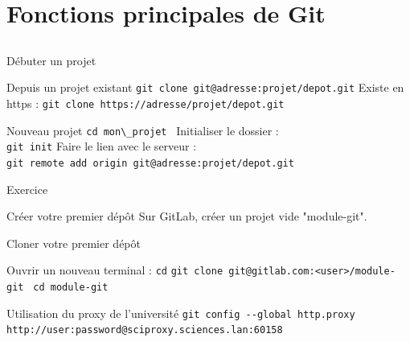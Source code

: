 \documentclass{beamer}
\begin{document}
\section{Fonctions principales de Git}
\subsection{}

\begin{frame}[fragile]{Débuter un projet}

  \begin{block}{Depuis un projet existant}
    \textcolor{commandcolor}{\verb?git clone git@adresse:projet/depot.git?}\linebreak
    Existe en https :\linebreak
    \textcolor{commandcolor}{\verb?git clone https://adresse/projet/depot.git?}
  \end{block}
  \begin{block}{Nouveau projet}
    \textcolor{commandcolor}{\verb?cd mon\_projet ?}\linebreak
    Initialiser le dossier :\\
    \textcolor{commandcolor}{\verb?git init?}\linebreak
    Faire le lien avec le serveur :\\
    \textcolor{commandcolor}{\verb?git remote add origin git@adresse:projet/depot.git?}
  \end{block}
\end{frame}

\begin{frame}[fragile]{Exercice}
  
  
  \begin{exampleblock}{Créer votre premier dépôt}
    Sur GitLab, créer un projet vide "module-git".%
  \end{exampleblock}
  
  \begin{exampleblock}{Cloner votre premier dépôt}
    \begin{small}
      Ouvrir un nouveau terminal :\linebreak
      \textcolor{commandcolor}{\verb?cd?}\linebreak
      \textcolor{commandcolor}{\verb?git clone git@gitlab.com:<user>/module-git ?}\linebreak
      \textcolor{commandcolor}{\verb?cd module-git?}
    \end{small}
  \end{exampleblock}
  
  \begin{alertblock}{Utilisation du proxy de l'université}
      \textcolor{commandcolor}{\verb?git config --global http.proxy  http://user:password@sciproxy.sciences.lan:60158?}
  \end{alertblock}
  
\end{frame}
\end{document}
